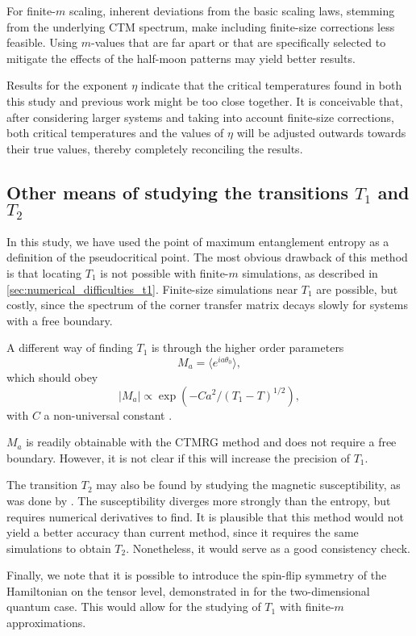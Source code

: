 For finite-$m$ scaling, inherent deviations from the basic scaling laws, stemming from the underlying CTM spectrum, make
including finite-size corrections less feasible.
Using $m$-values that are far apart or that are specifically selected to mitigate the effects of the half-moon patterns
may yield better results.

Results for the exponent $\eta$ indicate that the critical temperatures found in both this study and previous work might
be too close together.
It is conceivable that, after considering larger systems and taking into account finite-size corrections,
both critical temperatures and the values of $\eta$ will be adjusted outwards towards their true values,
thereby completely reconciling the results.

\subsection{Other means of studying the transitions $T_1$ and $T_2$}

In this study, we have used the point of maximum entanglement entropy as a definition of the pseudocritical point.
The most obvious drawback of this method is that locating $T_1$ is not possible with finite-$m$ simulations,
as described in \autoref{sec:numerical_difficulties_t1}.
Finite-size simulations near $T_1$ are possible, but costly, since the spectrum of the corner transfer matrix decays
slowly for systems with a free boundary.

A different way of finding $T_1$ is through the higher order parameters
\begin{equation}
  M_a = \langle e^{i a \theta_0 } \rangle,
\end{equation}
which should obey
\begin{equation}
  |M_a| \propto \exp \left(-Ca^2 / (T_1 - T)^{1/2} \right),
\end{equation}
with $C$ a non-universal constant \cite{cardy1980general}.

$M_a$ is readily obtainable with the CTMRG method and does not require a free boundary.
However, it is not clear if this will increase the precision of $T_1$.

The transition $T_2$ may also be found by studying the magnetic susceptibility,
as was done by \cite{borisenko2011numerical}.
The susceptibility diverges more strongly than the entropy, but requires numerical derivatives to find.
It is plausible that this method would not yield a better accuracy than current method,
since it requires the same simulations to obtain $T_2$. Nonetheless, it would serve as a good consistency check.

Finally, we note that it is possible to introduce the spin-flip symmetry of the Hamiltonian on the tensor level,
demonstrated in \cite{bauer2011implementing} for the two-dimensional quantum case.
This would allow for the studying of $T_1$ with finite-$m$ approximations.

